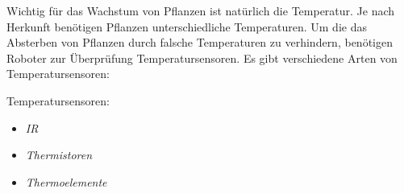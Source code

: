 Wichtig für das Wachstum von Pflanzen ist natürlich die Temperatur. Je nach
Herkunft benötigen Pflanzen unterschiedliche Temperaturen. Um die das Absterben
von Pflanzen durch falsche Temperaturen zu verhindern, benötigen Roboter zur
Überprüfung Temperatursensoren. Es gibt verschiedene Arten von
Temperatursensoren:

\begin{description}
	\item {Temperatursensoren:}
	      \begin{itemize}
		      \item {\textit{IR}}\\
					
		      \item {\textit{Thermistoren}}\\
		            
		      \item {\textit{Thermoelemente}}\\
		            
	      \end{itemize}
\end{description}
